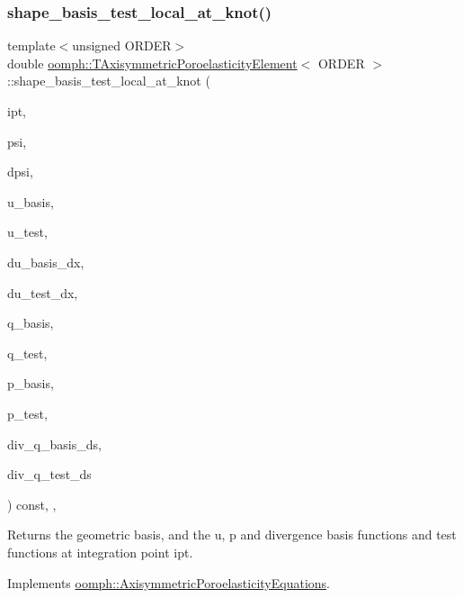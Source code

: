\subsubsection{\texorpdfstring{shape\+\_\+basis\+\_\+test\+\_\+local\+\_\+at\+\_\+knot()}{shape\_basis\_test\_local\_at\_knot()}}
{\footnotesize\ttfamily template$<$unsigned O\+R\+D\+ER$>$ \\
double \hyperlink{classoomph_1_1TAxisymmetricPoroelasticityElement}{oomph\+::\+T\+Axisymmetric\+Poroelasticity\+Element}$<$ O\+R\+D\+ER $>$\+::shape\+\_\+basis\+\_\+test\+\_\+local\+\_\+at\+\_\+knot (\begin{DoxyParamCaption}\item[{const unsigned \&}]{ipt,  }\item[{\hyperlink{classoomph_1_1Shape}{Shape} \&}]{psi,  }\item[{\hyperlink{classoomph_1_1DShape}{D\+Shape} \&}]{dpsi,  }\item[{\hyperlink{classoomph_1_1Shape}{Shape} \&}]{u\+\_\+basis,  }\item[{\hyperlink{classoomph_1_1Shape}{Shape} \&}]{u\+\_\+test,  }\item[{\hyperlink{classoomph_1_1DShape}{D\+Shape} \&}]{du\+\_\+basis\+\_\+dx,  }\item[{\hyperlink{classoomph_1_1DShape}{D\+Shape} \&}]{du\+\_\+test\+\_\+dx,  }\item[{\hyperlink{classoomph_1_1Shape}{Shape} \&}]{q\+\_\+basis,  }\item[{\hyperlink{classoomph_1_1Shape}{Shape} \&}]{q\+\_\+test,  }\item[{\hyperlink{classoomph_1_1Shape}{Shape} \&}]{p\+\_\+basis,  }\item[{\hyperlink{classoomph_1_1Shape}{Shape} \&}]{p\+\_\+test,  }\item[{\hyperlink{classoomph_1_1Shape}{Shape} \&}]{div\+\_\+q\+\_\+basis\+\_\+ds,  }\item[{\hyperlink{classoomph_1_1Shape}{Shape} \&}]{div\+\_\+q\+\_\+test\+\_\+ds }\end{DoxyParamCaption}) const\hspace{0.3cm}{\ttfamily [inline]}, {\ttfamily [protected]}, {\ttfamily [virtual]}}



Returns the geometric basis, and the u, p and divergence basis functions and test functions at integration point ipt. 



Implements \hyperlink{classoomph_1_1AxisymmetricPoroelasticityEquations_a3e0f7b110f60d59bc047d9686de47111}{oomph\+::\+Axisymmetric\+Poroelasticity\+Equations}.



